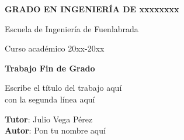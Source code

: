 \thispagestyle{empty}
\vspace{2cm}

\begin{figure}[htb]
  \centerline{}
\end{figure}

\begin{center}
  {\Large {\bf GRADO EN INGENIERÍA DE xxxxxxxx}}
  \vspace{5mm}
 
  {\large {Escuela de Ingeniería de Fuenlabrada}}
  \vspace{5mm}

  {\large {Curso académico 20xx-20xx}}

  \vspace{1cm}

  {\large {\bf Trabajo Fin de Grado}}

  \vspace{2cm}

  {\Large {Escribe el título del trabajo aquí\\
               con la segunda línea aquí\\[1cm] }}

  \vspace{5cm}
  {\bf Tutor}: Julio Vega Pérez \\
  {\bf Autor}: Pon tu nombre aquí
\end{center}

\clearpage
\thispagestyle{empty}
